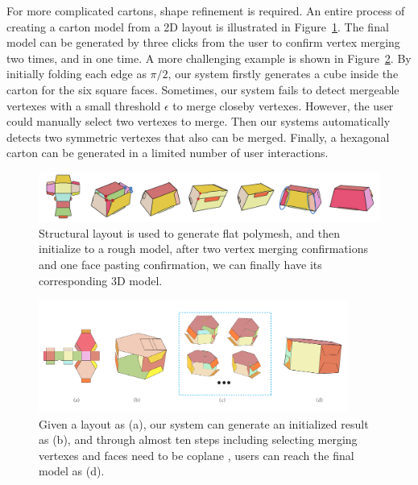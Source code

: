 For more complicated cartons, shape refinement is required. 
An entire process of creating a carton model from a 2D layout is illustrated in Figure~\ref{fig:result}.
%
The final model can be generated by three clicks from the user to confirm vertex merging two times, and  in one time.
%
A more challenging example is shown in Figure~\ref{fig:hexagon}. 
By initially folding each edge as $\pi/2$, our system firstly generates a cube inside the carton for the six square faces. 
Sometimes, our system fails to detect mergeable vertexes with a small threshold $\epsilon$ to merge closeby vertexes.
%
However, the user could manually select two vertexes to merge. Then our systems automatically detects two symmetric vertexes that also can be merged. 
%
Finally, a hexagonal carton can be generated in a limited number of user interactions.
%


\begin{figure}
	\centering
	\includegraphics[width=\textwidth]{images/105}
	\caption{Structural layout is used to generate flat polymesh, and then initialize to a rough model, after two vertex merging confirmations and one face pasting confirmation, we can finally have its corresponding 3D model.}
	\label{fig:result}
\end{figure}
%





\begin{figure}
	\centering
	\includegraphics[width=0.9\textwidth]{images/limitation}
	\caption{Given a layout as (a), our system can generate an initialized result as (b), and through almost ten steps including selecting merging vertexes and faces need to be coplane , users can reach the final model as (d). }
	\label{fig:hexagon}
\end{figure}


